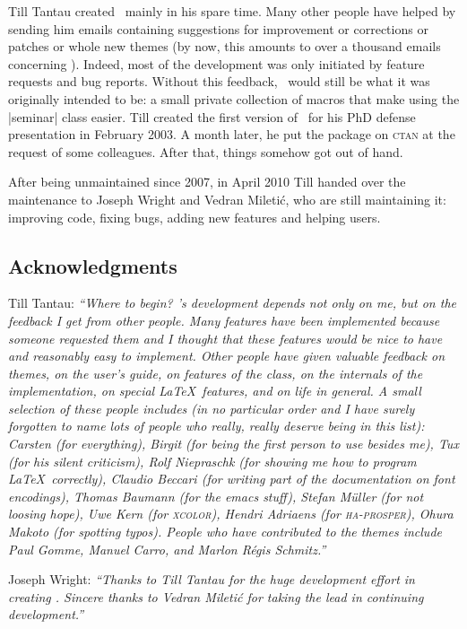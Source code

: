 Till Tantau created \beamer\ mainly in his spare time. Many other people have helped by sending him emails containing suggestions for improvement or corrections or patches or whole new themes (by now, this amounts to over a thousand emails concerning \beamer). Indeed, most of the development was only initiated by feature requests and bug reports. Without this feedback, \beamer\ would still be what it was originally intended to be: a small private collection of macros that make using the |seminar| class easier. Till created the first version of \beamer\ for his PhD defense presentation in February 2003. A month later, he put the package on \textsc{ctan} at the request of some colleagues. After that, things somehow got out of hand.

After being unmaintained since 2007, in April 2010 Till handed over the maintenance to Joseph Wright and Vedran Mileti\'c, who are still maintaining it: improving code, fixing bugs, adding new features and helping users.


\subsection{Acknowledgments}

Till Tantau: \emph{``Where to begin? \textsl{\beamer}'s development depends not only on me, but on the feedback I get from other people. Many features have been implemented because someone requested them and I thought that these features would be nice to have and reasonably easy to implement. Other people have given valuable feedback on themes, on the user's guide, on features of the class, on the internals of the implementation, on special \LaTeX\ features, and on life in general. A small selection of these people includes (in no particular order and I have surely forgotten to name lots of people who really, really deserve being in this list): Carsten (for everything), Birgit (for being the first person to use \textsl{\beamer} besides me), Tux (for his silent criticism), Rolf Niepraschk (for showing me how to program \LaTeX\ correctly), Claudio Beccari (for writing part of the documentation  on font encodings), Thomas Baumann (for the emacs stuff), Stefan M\"uller (for not loosing hope), Uwe Kern (for \textsl{\textsc{xcolor}}), 
Hendri Adriaens (for \textsl{\textsc{ha-prosper}}), Ohura Makoto (for spotting typos). People who have contributed to the themes include Paul Gomme, Manuel Carro, and Marlon R\'egis Schmitz.''}

Joseph Wright: \emph{``Thanks to Till Tantau for the huge development effort in creating \textsl{\beamer}. Sincere thanks to Vedran Mileti\'c for taking the lead in continuing development.''}

